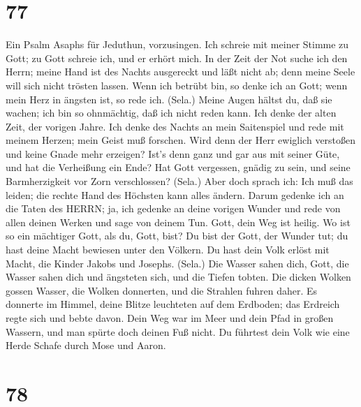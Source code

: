 \hypertarget{section-76}{%
\section{77}\label{section-76}}

 Ein Psalm Asaphs für Jeduthun, vorzusingen. Ich schreie mit
meiner Stimme zu Gott; zu Gott schreie ich, und er erhört mich.
 In der Zeit der Not suche ich den Herrn; meine Hand ist des
Nachts ausgereckt und läßt nicht ab; denn meine Seele will sich nicht
trösten lassen.  Wenn ich betrübt bin, so denke ich an Gott;
wenn mein Herz in ängsten ist, so rede ich. (Sela.)  Meine
Augen hältst du, daß sie wachen; ich bin so ohnmächtig, daß ich nicht
reden kann.  Ich denke der alten Zeit, der vorigen Jahre.
 Ich denke des Nachts an mein Saitenspiel und rede mit
meinem Herzen; mein Geist muß forschen.  Wird denn der Herr
ewiglich verstoßen und keine Gnade mehr erzeigen?  Ist's
denn ganz und gar aus mit seiner Güte, und hat die Verheißung ein Ende?
 Hat Gott vergessen, gnädig zu sein, und seine
Barmherzigkeit vor Zorn verschlossen? (Sela.)  Aber doch
sprach ich: Ich muß das leiden; die rechte Hand des Höchsten kann alles
ändern.  Darum gedenke ich an die Taten des HERRN; ja, ich
gedenke an deine vorigen Wunder  und rede von allen deinen
Werken und sage von deinem Tun.  Gott, dein Weg ist heilig.
Wo ist so ein mächtiger Gott, als du, Gott, bist?  Du bist
der Gott, der Wunder tut; du hast deine Macht bewiesen unter den
Völkern.  Du hast dein Volk erlöst mit Macht, die Kinder
Jakobs und Josephs. (Sela.)  Die Wasser sahen dich, Gott,
die Wasser sahen dich und ängsteten sich, und die Tiefen tobten.
 Die dicken Wolken gossen Wasser, die Wolken donnerten, und
die Strahlen fuhren daher.  Es donnerte im Himmel, deine
Blitze leuchteten auf dem Erdboden; das Erdreich regte sich und bebte
davon.  Dein Weg war im Meer und dein Pfad in großen
Wassern, und man spürte doch deinen Fuß nicht.  Du führtest
dein Volk wie eine Herde Schafe durch Mose und Aaron.

\hypertarget{section-77}{%
\section{78}\label{section-77}}

